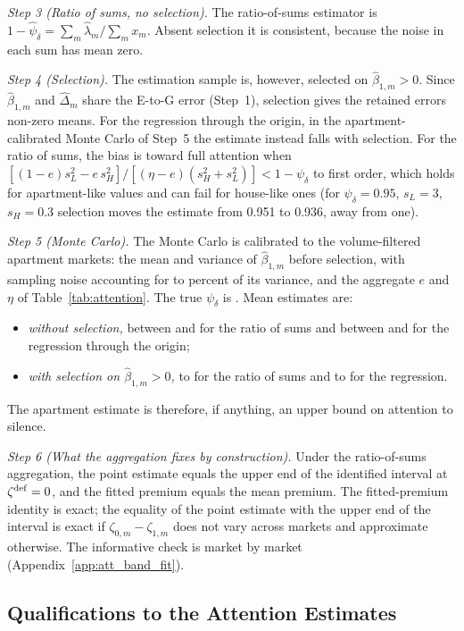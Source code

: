 \emph{Step 3 (Ratio of sums, no selection).} The ratio-of-sums estimator is $1-\hat\psi_\delta=\sum_m\hat\lambda_m/\sum_mx_m$. Absent selection it is consistent, because the noise in each sum has mean zero.

\emph{Step 4 (Selection).} The estimation sample is, however, selected on $\hat\beta_{1,m}>0$. Since $\hat\beta_{1,m}$ and $\hat\Delta_m$ share the E-to-G error (Step~1), selection gives the retained errors non-zero means. For the regression through the origin, in the apartment-calibrated Monte Carlo of Step~5 the estimate instead falls with selection. For the ratio of sums, the bias is toward full attention when $[(1-e)s_L^2-e\,s_H^2]/[(\eta-e)(s_H^2+s_L^2)]<1-\psi_\delta$ to first order, which holds for apartment-like values and can fail for house-like ones (for $\psi_\delta=0.95$, $s_L=3$, $s_H=0.3$ selection moves the estimate from 0.951 to 0.936, away from one).

\emph{Step 5 (Monte Carlo).} The Monte Carlo is calibrated to the \attMCmarkets{} volume-filtered apartment markets: the mean and variance of $\hat\beta_{1,m}$ before selection, with sampling noise accounting for \attMCshareLo{} to \attMCshareHi{} percent of its variance, and the aggregate $e$ and $\eta$ of Table~\ref{tab:attention}. The true $\psi_\delta$ is \attMCtrue{}. Mean estimates are:
\begin{itemize}
    \item \emph{without selection,} between \attMCromLo{} and \attMCromHi{} for the ratio of sums and between \attMColsLo{} and \attMColsHi{} for the regression through the origin;
    \item \emph{with selection on $\hat\beta_{1,m}>0$,} \attMCromSelLo{} to \attMCromSelHi{} for the ratio of sums and \attMColsSelLo{} to \attMColsSelHi{} for the regression.
\end{itemize}
The apartment estimate is therefore, if anything, an upper bound on attention to silence.

\emph{Step 6 (What the aggregation fixes by construction).} Under the ratio-of-sums aggregation, the point estimate equals the upper end of the identified interval at $\zeta^{\rm def}=0$, and the fitted premium equals the mean premium. The fitted-premium identity is exact; the equality of the point estimate with the upper end of the interval is exact if $\zeta_{0,m}-\zeta_{1,m}$ does not vary across markets and approximate otherwise. The informative check is market by market (Appendix~\ref{app:att_band_fit}).

\subsection*{Qualifications to the Attention Estimates}
\label{app:att_qualifications}


